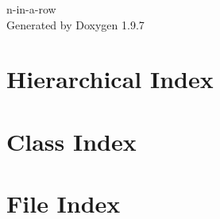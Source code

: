 \documentclass[twoside]{book}
\newcommand{\+}{\discretionary{\mbox{\scriptsize$\hookleftarrow$}}{}{}}
\newcommand{\clearemptydoublepage}{%
    \newpage{\pagestyle{empty}\cleardoublepage}%
  }
\begin{document}
  \raggedbottom
    \hypersetup{pageanchor=false,
                bookmarksnumbered=true,
                pdfencoding=unicode
               }
  \begin{titlepage}
  \vspace*{7cm}
  \begin{center}%
  {\Large n-\/in-\/a-\/row}\\
  \vspace*{1cm}
  {\large Generated by Doxygen 1.9.7}\\
  \end{center}
  \end{titlepage}
  \clearemptydoublepage
  \tableofcontents
  \clearemptydoublepage
  \hypersetup{pageanchor=true}

\chapter{Hierarchical Index}

\chapter{Class Index}

\chapter{File Index}

\end{document}
